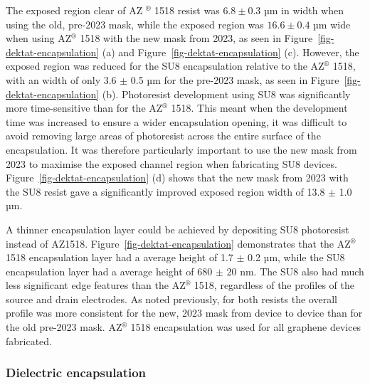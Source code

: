 \documentclass[
  a4paper,
]{scrbook}
\begin{document}
The exposed region clear of AZ \(^\circledR\) 1518 resist was
\(6.8 \pm 0.3\) µm in width when using the old, pre-2023 mask, while the
exposed region was \(16.6 \pm 0.4\) µm wide when using AZ\(^\circledR\)
1518 with the new mask from 2023, as seen in
Figure~\ref{fig-dektat-encapsulation} (a) and
Figure~\ref{fig-dektat-encapsulation} (c). However, the exposed region
was reduced for the SU8 encapsulation relative to the AZ\(^\circledR\)
1518, with an width of only 3.6 \(\pm\) 0.5 µm for the pre-2023 mask, as
seen in Figure~\ref{fig-dektat-encapsulation} (b). Photoresist
development using SU8 was significantly more time-sensitive than for the
AZ\(^\circledR\) 1518. This meant when the development time was
increased to ensure a wider encapsulation opening, it was difficult to
avoid removing large areas of photoresist across the entire surface of
the encapsulation. It was therefore particularly important to use the
new mask from 2023 to maximise the exposed channel region when
fabricating SU8 devices. Figure~\ref{fig-dektat-encapsulation} (d) shows
that the new mask from 2023 with the SU8 resist gave a significantly
improved exposed region width of 13.8 \(\pm\) 1.0 µm.

A thinner encapsulation layer could be achieved by depositing SU8
photoresist instead of AZ1518. Figure~\ref{fig-dektat-encapsulation}
demonstrates that the AZ\(^\circledR\) 1518 encapsulation layer had a
average height of 1.7 \(\pm\) 0.2 µm, while the SU8 encapsulation layer
had a average height of 680 \(\pm\) 20 nm. The SU8 also had much less
significant edge features than the AZ\(^\circledR\) 1518, regardless of
the profiles of the source and drain electrodes. As noted previously,
for both resists the overall profile was more consistent for the new,
2023 mask from device to device than for the old pre-2023 mask.
AZ\(^\circledR\) 1518 encapsulation was used for all graphene devices
fabricated.

\hypertarget{dielectric-encapsulation}{%
\subsubsection*{Dielectric
encapsulation}\label{dielectric-encapsulation}}
\end{document}
